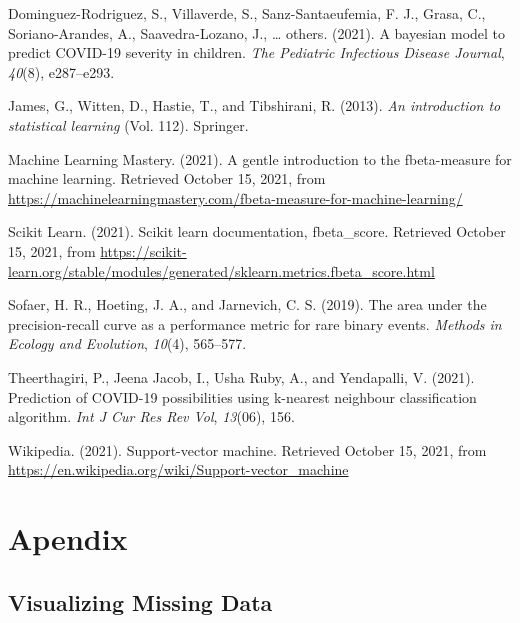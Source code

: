 \documentclass[
  10pt,
]{article}
\newlength{\cslhangindent}
\newlength{\cslentryspacingunit} %
\newenvironment{CSLReferences}[2] %
 {%
  \setlength{\parindent}{0pt}
  \ifodd #1
  \let\oldpar\par
  \def\par{\hangindent=\cslhangindent\oldpar}
  \fi
  \setlength{\parskip}{#2\cslentryspacingunit}
 }%
 {}
\begin{document}
\hypertarget{refs}{}
\begin{CSLReferences}{1}{0}
\leavevmode{}%
Dominguez-Rodriguez, S., Villaverde, S., Sanz-Santaeufemia, F. J., Grasa, C., Soriano-Arandes, A., Saavedra-Lozano, J., \ldots{} others. (2021). A bayesian model to predict COVID-19 severity in children. \emph{The Pediatric Infectious Disease Journal}, \emph{40}(8), e287--e293.

\leavevmode{}%
James, G., Witten, D., Hastie, T., and Tibshirani, R. (2013). \emph{An introduction to statistical learning} (Vol. 112). Springer.

\leavevmode{}%
Machine Learning Mastery. (2021). A gentle introduction to the fbeta-measure for machine learning. Retrieved October 15, 2021, from \url{https://machinelearningmastery.com/fbeta-measure-for-machine-learning/}

\leavevmode{}%
Scikit Learn. (2021). Scikit learn documentation, fbeta\_score. Retrieved October 15, 2021, from \url{https://scikit-learn.org/stable/modules/generated/sklearn.metrics.fbeta_score.html}

\leavevmode{}%
Sofaer, H. R., Hoeting, J. A., and Jarnevich, C. S. (2019). The area under the precision-recall curve as a performance metric for rare binary events. \emph{Methods in Ecology and Evolution}, \emph{10}(4), 565--577.

\leavevmode{}%
Theerthagiri, P., Jeena Jacob, I., Usha Ruby, A., and Yendapalli, V. (2021). Prediction of COVID-19 possibilities using k-nearest neighbour classification algorithm. \emph{Int J Cur Res Rev\textbar{} Vol}, \emph{13}(06), 156.

\leavevmode{}%
Wikipedia. (2021). Support-vector machine. Retrieved October 15, 2021, from \url{https://en.wikipedia.org/wiki/Support-vector_machine}

\end{CSLReferences}

\hypertarget{apendix}{%
\section*{Apendix}\label{apendix}}

\hypertarget{visualizing-missing-data}{%
\subsection{Visualizing Missing Data}\label{visualizing-missing-data}}
\end{document}
